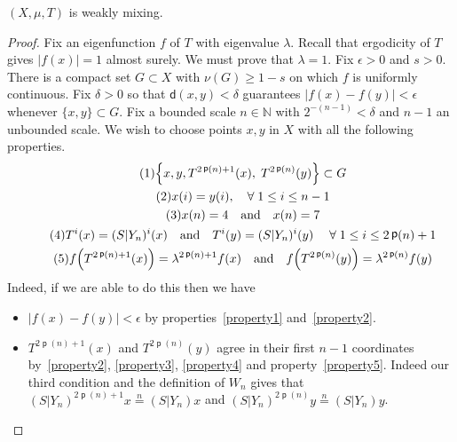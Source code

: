 \documentclass[AHL,Unicode,longabstracts,published]{cedram}
\DeclareMathOperator{\p}{\mathsf{p}}
\newcommand{\N}{\mathbb{N}}
\newcommand{\metric}{\mathsf{d}}
\let\originalleft\left
\let\originalright\right
\renewcommand{\left}{\mathopen{}\mathclose\bgroup\originalleft}
\renewcommand{\right}{\aftergroup\egroup\originalright}
\let\oldforall\forall
\renewcommand*{\forall}{\mathrel{\oldforall}}
\begin{document}
\begin{prop}
$(X,\mu,T)$ is weakly mixing.
\end{prop}
\begin{proof}
Fix an eigenfunction $f$ of $T$ with eigenvalue $\lambda$. Recall that ergodicity of $T$ gives $|f(x)| = 1$ almost surely. We must prove that $\lambda = 1$. Fix $\epsilon > 0$ and $s > 0$. There is a compact set $G \subset X$ with $\nu(G) \ge 1 - s$ on which $f$ is uniformly continuous. Fix $\delta > 0$ so that $\metric(x,y) < \delta$ guarantees $|f(x) - f(y)| < \epsilon$ whenever $\{x,y\} \subset G$. Fix a bounded scale $n \in \N$ with $2^{-(n-1)} < \delta$ and $n-1$ an unbounded scale. We wish to choose points $x,y$ in $X$ with all the following properties.
\begin{gather}
\tag{1}\label{property1} \left\{ x,y, T^{2\p(n)+1}(x),\; T^{2\p(n)}(y) \right\} \subset G\\
\tag{2}\label{property2} x(i) = y(i),\quad\forall 1 \le i \le n-1\\
\tag{3}\label{property3} x(n) = 4\quad\text{and} \quad x(n) = 7\\
\tag{4}\label{property4} T^i(x) = (S|Y_n)^i(x)\quad\text{and} \quad T^i(y) = (S|Y_n)^i(y) \quad \forall 1 \le i \le 2 \p(n)+1\\
\tag{5}\label{property5} f\left(T^{2\p(n)+1}(x)\right) = \lambda^{2 \p(n) + 1} f(x)\quad\text{and} \quad f\left(T^{2\p(n)}(y)\right) = \lambda^{2 \p(n)} f(y)
\end{gather}
Indeed, if we are able to do this then we have
\begin{itemize}
\item $|f(x) - f(y)| < \epsilon$ by properties~\eqref{property1} and~\eqref{property2}.
\item $T^{2 \p(n) + 1}(x)$ and $T^{2 \p(n)}(y)$ agree in their first $n-1$ coordinates by~\eqref{property2}, \eqref{property3}, \eqref{property4} and property~\eqref{property5}. Indeed our third condition and the definition of $W_n$ gives that $(S|Y_n)^{2\p(n)+1}x\overset{n}{=}(S|Y_n)x$ and $(S|Y_n)^{2\p(n)}y\overset{n}{=}(S|Y_n)y$.

\end{itemize}
\end{proof}
\end{document}
